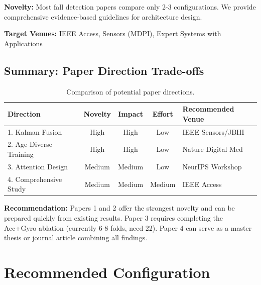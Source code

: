 \documentclass{article}
\begin{document}
\textbf{Novelty:} Most fall detection papers compare only 2-3 configurations. We provide comprehensive evidence-based guidelines for architecture design.

\textbf{Target Venues:} IEEE Access, Sensors (MDPI), Expert Systems with Applications

\subsection{Summary: Paper Direction Trade-offs}

\begin{table}[htbp]
    \centering
    \caption{Comparison of potential paper directions.}
    \label{tab:paper_directions}
    \begin{tabular}{lcccl}
        \toprule
        \textbf{Direction} & \textbf{Novelty} & \textbf{Impact} & \textbf{Effort} & \textbf{Recommended Venue} \\
        \midrule
        1. Kalman Fusion & High & High & Low & IEEE Sensors/JBHI \\
        2. Age-Diverse Training & High & High & Low & Nature Digital Med \\
        3. Attention Design & Medium & Medium & Low & NeurIPS Workshop \\
        4. Comprehensive Study & Medium & Medium & Medium & IEEE Access \\
        \bottomrule
    \end{tabular}
\end{table}

\textbf{Recommendation:} Papers 1 and 2 offer the strongest novelty and can be prepared quickly from existing results. Paper 3 requires completing the Acc+Gyro ablation (currently 6-8 folds, need 22). Paper 4 can serve as a master thesis or journal article combining all findings.

\appendix

\section{Recommended Configuration}
\end{document}
